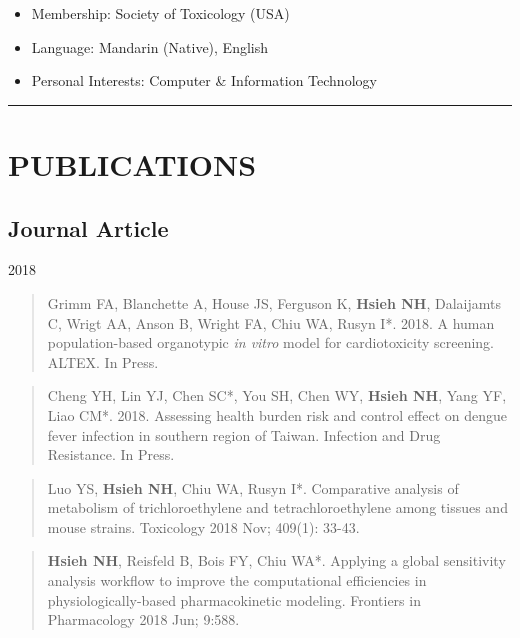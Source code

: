 \documentclass[10pt,]{article}
\providecommand{\tightlist}{%
  \setlength{\itemsep}{0pt}\setlength{\parskip}{0pt}}
\begin{document}
\begin{itemize}
\tightlist
\item
  Membership: Society of Toxicology (USA)
\item
  Language: Mandarin (Native), English
\item
  Personal Interests: Computer \& Information Technology
\end{itemize}

\begin{center}\rule{0.5\linewidth}{\linethickness}\end{center}

\section{PUBLICATIONS}\label{publications}

\subsection{Journal Article}\label{journal-article}

2018

\begin{quote}
Grimm FA, Blanchette A, House JS, Ferguson K, \textbf{Hsieh NH},
Dalaijamts C, Wrigt AA, Anson B, Wright FA, Chiu WA, Rusyn I*. 2018. A
human population-based organotypic \emph{in vitro} model for
cardiotoxicity screening. ALTEX. In Press.
\end{quote}

\begin{quote}
Cheng YH, Lin YJ, Chen SC*, You SH, Chen WY, \textbf{Hsieh NH}, Yang YF,
Liao CM*. 2018. Assessing health burden risk and control effect on
dengue fever infection in southern region of Taiwan. Infection and Drug
Resistance. In Press.
\end{quote}

\begin{quote}
Luo YS, \textbf{Hsieh NH}, Chiu WA, Rusyn I*. Comparative analysis of
metabolism of trichloroethylene and tetrachloroethylene among tissues
and mouse strains. Toxicology 2018 Nov; 409(1): 33-43.
\end{quote}

\begin{quote}
\textbf{Hsieh NH}, Reisfeld B, Bois FY, Chiu WA*. Applying a global
sensitivity analysis workflow to improve the computational efficiencies
in physiologically-based pharmacokinetic modeling. Frontiers in
Pharmacology 2018 Jun; 9:588.
\end{quote}
\end{document}
